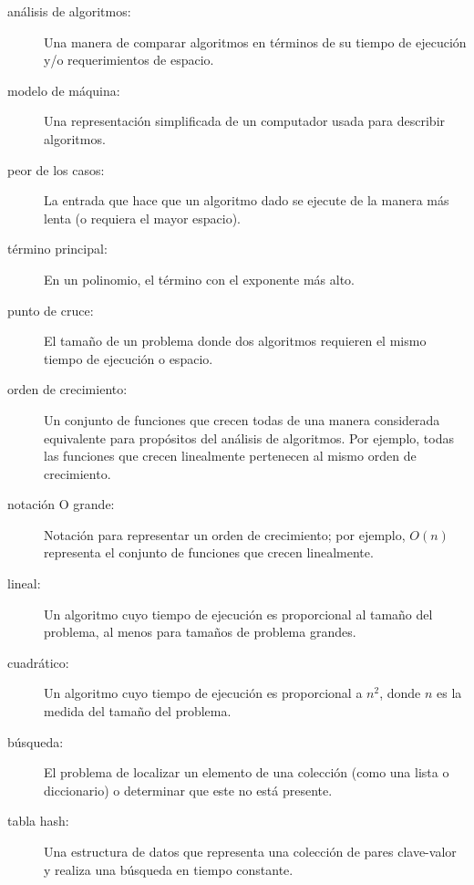 \documentclass[10pt]{book}
\begin{document}
\begin{description}

\item[análisis de algoritmos:] Una manera de comparar algoritmos en términos de
su tiempo de ejecución y/o requerimientos de espacio.

\item[modelo de máquina:] Una representación simplificada de un computador usada
para describir algoritmos.

\item[peor de los casos:] La entrada que hace que un algoritmo dado se ejecute de la manera más lenta (o
requiera el mayor espacio).

\item[término principal:] En un polinomio, el término con el exponente más alto.

\item[punto de cruce:] El tamaño de un problema donde dos algoritmos requieren
el mismo tiempo de ejecución o espacio.

\item[orden de crecimiento:] Un conjunto de funciones que crecen todas de una manera
considerada equivalente para propósitos del análisis de algoritmos.
Por ejemplo, todas las funciones que crecen linealmente pertenecen al mismo
orden de crecimiento.

\item[notación O grande:] Notación para representar un orden de crecimiento;
por ejemplo, $O(n)$ representa el conjunto de funciones que crecen
linealmente.

\item[lineal:] Un algoritmo cuyo tiempo de ejecución es proporcional al
tamaño del problema, al menos para tamaños de problema grandes.

\item[cuadrático:] Un algoritmo cuyo tiempo de ejecución es proporcional a
$n^2$, donde $n$ es la medida del tamaño del problema.

\item[búsqueda:] El problema de localizar un elemento de una colección
(como una lista o diccionario) o determinar que este no está presente.

\item[tabla hash:] Una estructura de datos que representa una colección de
pares clave-valor y realiza una búsqueda en tiempo constante.

\end{description}


\printindex

\clearemptydoublepage
\end{document}
